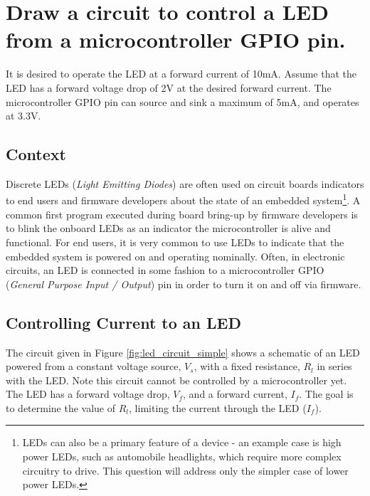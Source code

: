\documentclass[main.tex]{subfiles}
\begin{document}
\section{Draw a circuit to control a LED from a microcontroller GPIO pin.} \label{section:led} 

It is desired to operate the LED at a forward current of 10mA. Assume that the LED has a forward voltage drop of 2V at the desired forward current. The microcontroller GPIO pin can source and sink a maximum of 5mA, and operates at 3.3V.

\spoilerline

\subsection{Context}
Discrete LEDs (\textit{Light Emitting Diodes}) are often used on circuit boards indicators to end users and firmware developers about the state of an embedded system\footnote{LEDs can also be a primary feature of a device - an example case is high power LEDs, such as automobile headlights, which require more complex circuitry to drive. This question will address only the simpler case of lower power LEDs.}. A common first program executed during board bring-up by firmware developers is to blink the onboard LEDs as an indicator the microcontroller is alive and functional. For end users, it is very common to use LEDs to indicate that the embedded system is powered on and operating nominally. Often, in electronic circuits, an LED is connected in some fashion to a microcontroller GPIO (\textit{General Purpose Input / Output}) pin in order to turn it on and off via firmware. 

\subsection{Controlling Current to an LED} 
\noindent The circuit given in Figure \ref{fig:led_circuit_simple} shows a schematic of an LED powered from a constant voltage source, $V_s$, with a fixed resistance, $R_l$ in series with the LED. Note this circuit cannot be controlled by a microcontroller yet. The LED has a forward voltage drop, $V_f$, and a forward current, $I_f$. The goal is to determine the value of $R_l$, limiting the current through the LED ($I_f$).
\end{document}
